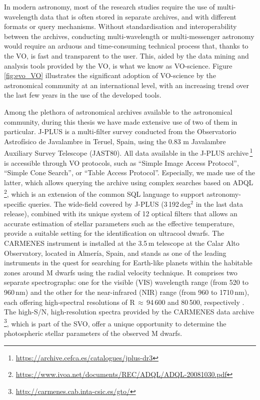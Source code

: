 In modern astronomy, most of the research studies require the use of multi-wavelength data that is often stored in separate archives, and with different formats or query mechanisms. Without standardisation and interoperability between the archives, conducting multi-wavelength or multi-messenger \citep{multimessenger} astronomy would require an arduous and time-consuming technical process that, thanks to the VO, is fast and transparent to the user. This, aided by the data mining and analysis tools provided by the VO, is what we know as VO-science. Figure \ref{fig:evo_VO} illustrates the significant adoption of VO-science by the astronomical community at an international level, with an increasing trend over the last few years in the use of the developed tools.

Among the plethora of astronomical archives available to the astronomical community, during this thesis we have made extensive use of two of them in particular. J-PLUS is a multi-filter survey conducted from the Observatorio Astrofísico de Javalambre \citep[OAJ;][]{OAJ} in Teruel, Spain, using the 0.83 m Javalambre Auxiliary Survey Telescope (JAST80). All data available in the J-PLUS archive\,\footnote{\url{https://archive.cefca.es/catalogues/jplus-dr3}} is accessible through VO protocols, such as ``Simple Image Access Protocol'', ``Simple Cone Search'', or ``Table Access Protocol''. Especially, we made use of the latter, which allows querying the archive using complex searches based on ADQL\,\footnote{\url{https://www.ivoa.net/documents/REC/ADQL/ADQL-20081030.pdf}}, which is an extension of the common SQL language to support astronomy-specific queries. The wide-field covered by J-PLUS (3\,192\,deg$^2$ in the last data release), combined with its unique system of 12 optical filters \citep{jpluscal} that allows an accurate estimation of stellar parameters such as the effective temperature, provide a suitable setting for the identification on ultracool dwarfs. The CARMENES instrument is installed at the 3.5\,m telescope at the Calar Alto Observatory, located in Almería, Spain, and stands as one of the leading instruments in the quest for searching for Earth-like planets within the habitable zones around M dwarfs using the radial velocity technique. It comprises two separate spectrographs: one for the visible (VIS) wavelength range (from 520 to 960\,nm) and the other for the near-infrared (NIR) range (from 960 to 1710\,nm), each offering high-spectral resolutions of R\,$\approx$\,94\,600 and 80\,500, respectively \citep{Quirrenbach20,reiners2018}. The high-S/N, high-resolution spectra provided by the CARMENES data archive\,\footnote{\url{http://carmenes.cab.inta-csic.es/gto/}}, which is part of the SVO, offer a unique opportunity to determine the photospheric stellar parameters of the observed M dwarfs.


